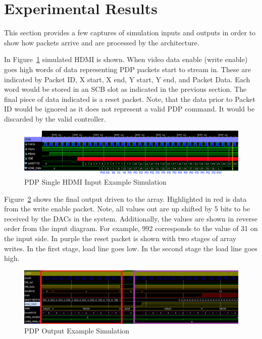 \section{Experimental Results}
This section provides a few captures of simulation inputs and outputs in order to show how packets arrive and are processed by the architecture.

In Figure~\ref{fig:input_example} simulated HDMI is shown. When video data enable (write enable) goes high words of data representing PDP packets start to stream in. These are indicated by Packet ID, X start, X end, Y start, Y end, and Packet Data. Each word would be stored in an SCB slot as indicated in the previous section. The final piece of data indicated is a reset packet. Note, that the data prior to Packet ID would be ignored as it does not represent a valid PDP command. It would be discarded by the valid controller.

\begin{figure}
    \centering
    \includegraphics[width=1.0\textwidth]{fig/pdp_input_example.png}
    \caption{PDP Single HDMI Input Example Simulation}
    \label{fig:input_example}
\end{figure}

Figure~\ref{fig:output_example} shows the final output driven to the array. Highlighted in red is data from the write enable packet. Note, all values out are up shifted by 5 bits to be received by the DACs in the system. Additionally, the values are shown in reverse order from the input diagram. For example, 992 corresponds to the value of 31 on the input side. In purple the reset packet is shown with two stages of array writes. In the first stage, load line goes low. In the second stage the load line goes high.

\begin{figure}
    \centering
    \includegraphics[width=1.0\textwidth]{fig/pdp_output_example.png}
    \caption{PDP Output Example Simulation}
    \label{fig:output_example}
\end{figure}
